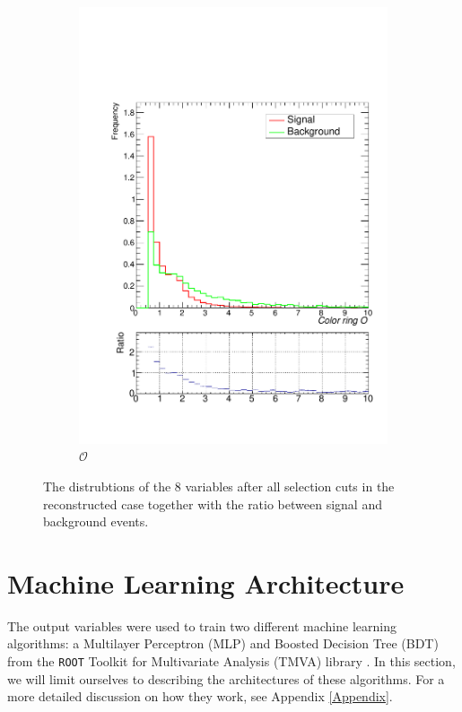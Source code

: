 \documentclass[10pt,a4paper]{book}
\def\code#1{\texttt{#1}}
\begin{document}
\begin{figure}
\begin{subfigure}{.5\textwidth}
\includegraphics[scale=0.25]{reco/cr}
\caption{$\mathcal{O}$}
\end{subfigure}
\caption{The distrubtions of the 8 variables after all selection cuts in the reconstructed case together with the ratio between signal and background events.}
\label{sgn/bkg reco}
\end{figure}


\section{Machine Learning Architecture}
The output variables were used to train two different machine learning algorithms: a Multilayer Perceptron (MLP) and Boosted Decision Tree (BDT) from the \code{ROOT} Toolkit for Multivariate Analysis (TMVA) library \cite{TMVA}. In this section, we will limit ourselves to describing the architectures of these algorithms. For a more detailed discussion on how they work, see Appendix \ref{Appendix}.
\end{document}
